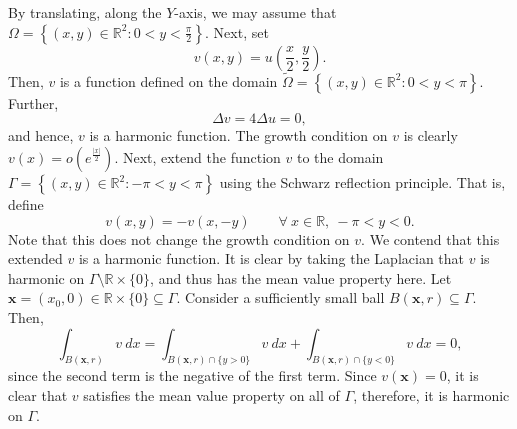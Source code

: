 \documentclass[10pt]{amsart}
\theoremstyle{thmstyle}
\theoremstyle{defstyle}
\newcommand{\R}{\mathbb{R}}
\newcommand{\wt}[1]{\widetilde{#1}}
\begin{document}
By translating, along the $Y$-axis, we may assume that $\Omega = \left\{(x, y)\in\R^2\colon 0 < y < \frac{\pi}{2}\right\}$. Next, set 
\begin{equation*}
    v(x, y) = u\left(\frac{x}{2}, \frac{y}{2}\right).
\end{equation*}
Then, $v$ is a function defined on the domain $\wt\Omega = \left\{(x, y)\in\R^2\colon 0 < y < \pi\right\}$. Further, 
\begin{equation*}
    \Delta v = 4\Delta u = 0,
\end{equation*}
and hence, $v$ is a harmonic function. The growth condition on $v$ is clearly $v(x) = o\left(e^{\frac{|x|}{2}}\right)$. Next, extend the function $v$ to the domain $\Gamma = \left\{(x, y)\in\R^2\colon -\pi < y < \pi\right\}$ using the Schwarz reflection principle. That is, define 
\begin{equation*}
    v(x, y) = -v(x, -y) \qquad\forall~x\in\R,~-\pi < y < 0.
\end{equation*}
Note that this does not change the growth condition on $v$. We contend that this extended $v$ is a harmonic function. It is clear by taking the Laplacian that $v$ is harmonic on $\Gamma\setminus\R\times\{0\}$, and thus has the mean value property here. Let $\mathbf x = (x_0, 0)\in\R\times\{0\}\subseteq\Gamma$. Consider a sufficiently small ball $B(\mathbf x, r)\subseteq\Gamma$. Then, 
\begin{equation*}
    \int_{B(\mathbf x, r)} v~dx = \int_{B(\mathbf x, r)\cap\{y > 0\}} v~dx + \int_{B(\mathbf x, r)\cap\{y < 0\}} v~dx = 0,
\end{equation*}
since the second term is the negative of the first term. Since $v(\mathbf x) = 0$, it is clear that $v$ satisfies the mean value property on all of $\Gamma$, therefore, it is harmonic on $\Gamma$.
\end{document}
